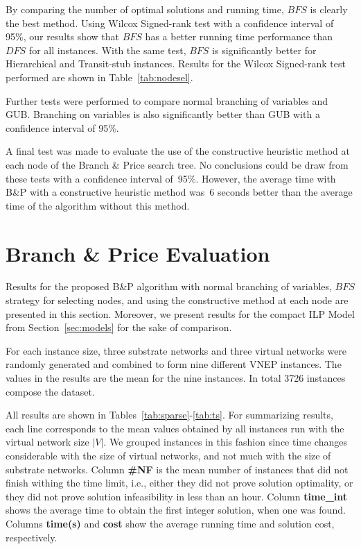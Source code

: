 By comparing the number of optimal solutions and running time, $BFS$ is clearly the best method.
Using Wilcox Signed-rank test with a confidence interval of 95\%, our results show that $BFS$ has a better running time performance than $DFS$ for all instances.
With the same test, $BFS$ is significantly better for Hierarchical and Transit-stub instances.
Results for the Wilcox Signed-rank test performed are shown in Table~\ref{tab:nodesel}.

Further tests were performed to compare normal branching of variables and GUB. 
Branching on variables is also significantly better than GUB with a confidence interval of 95\%.

A final test was made to evaluate the use of the constructive heuristic method at each node of the Branch \& Price search tree.
No conclusions could be draw from these tests with a confidence interval of~95\%.
However, the average time with B\&P with a constructive heuristic method was~6 seconds better than the average time of the algorithm without this method.

\section{Branch \& Price Evaluation}
\label{sec:bptest}

Results for the proposed B\&P algorithm with normal branching of variables, $BFS$ strategy for selecting nodes, and using the constructive method at each node are presented in this section.
Moreover, we present results for the compact ILP Model from Section~\ref{sec:models} for the sake of comparison.

For each instance size, three substrate networks and three virtual networks were randomly generated and combined to form nine different VNEP instances. The values in the results are the mean for the nine instances. In total 3726 instances compose the dataset.

All results are shown in Tables~\ref{tab:sparse}-\ref{tab:ts}. 
For summarizing results, each line corresponds to the mean values obtained by all instances run with the virtual network size $|V|$. 
We grouped instances in this fashion since time changes considerable with the size of virtual networks, and not much with the size of substrate networks.
Column \textbf{\#NF} is the mean number of instances that did not finish withing the time limit, i.e., 
either they did not prove solution optimality, or they did not prove solution infeasibility in less than an hour. 
Column \textbf{time\_int} shows the average time to obtain the first integer solution, when one was found. 
Columns \textbf{time(s)} and \textbf{cost} show the average running time and solution cost, respectively.

